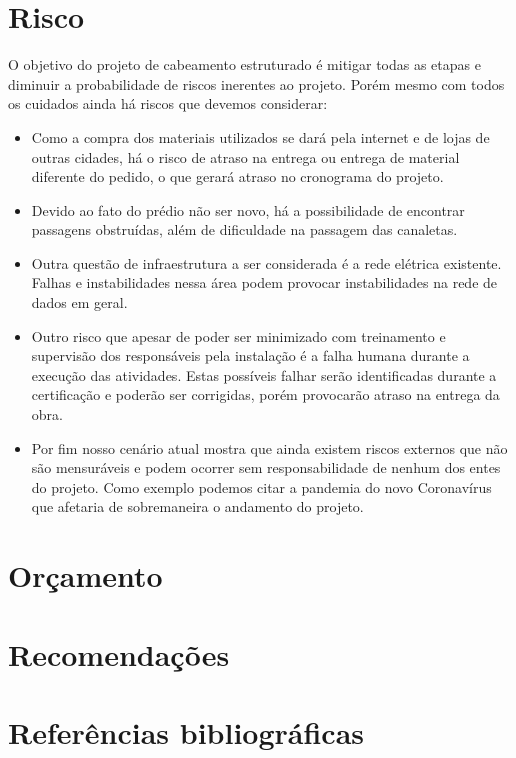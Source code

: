 \documentclass[	DIV=calc,%
							paper=a4,%
							fontsize=12pt,%
							onecolumn]{scrartcl}	 					%
\begin{document}
\section{Risco}
O objetivo do projeto de cabeamento estruturado é mitigar todas as etapas e diminuir a probabilidade de riscos inerentes ao projeto. Porém mesmo com todos os cuidados ainda há riscos que devemos considerar:
\begin{itemize}
\item Como a compra dos materiais utilizados se dará pela internet e de lojas de outras cidades, há o risco de atraso na entrega ou entrega de material diferente do pedido, o que gerará atraso no cronograma do projeto.

\item Devido ao fato do prédio não ser novo, há a possibilidade de encontrar passagens obstruídas, além de dificuldade na passagem das canaletas.

\item Outra questão de infraestrutura a ser considerada é a rede elétrica existente. Falhas e instabilidades nessa área podem provocar instabilidades na rede de dados em geral.

\item Outro risco que apesar de poder ser minimizado com treinamento e supervisão dos responsáveis pela instalação é a falha humana durante a execução das atividades. Estas possíveis falhar serão identificadas durante a certificação e poderão ser corrigidas, porém provocarão atraso na entrega da obra. 

\item Por fim nosso cenário atual mostra que ainda existem riscos externos que não são mensuráveis e podem ocorrer sem responsabilidade de nenhum dos entes do projeto. Como exemplo podemos citar a pandemia do novo Coronavírus que afetaria de sobremaneira o andamento do projeto.
\end{itemize}

\section{Orçamento}

\section{Recomendações}
\clearpage
\section{Referências bibliográficas}
\end{document}
